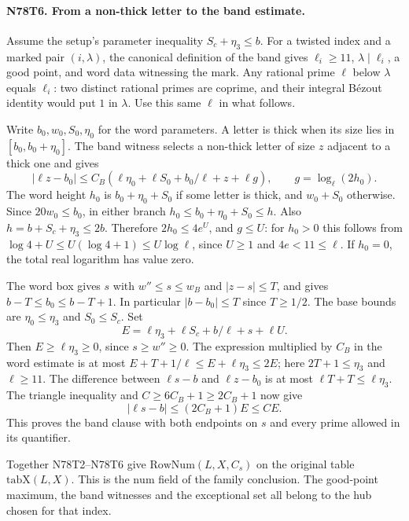 \paragraph{N78T6. From a non-thick letter to the band estimate.}
Assume the setup's parameter inequality $S_c+\eta_3\le b$.
For a twisted index and a marked pair $(i,\lambda)$, the canonical
definition of the band gives $\ell_i\ge11$, $\lambda\mid\ell_i$,
a good point, and word data witnessing the mark. Any rational prime
$\ell$ below $\lambda$ equals $\ell_i$: two distinct rational primes
are coprime, and their integral B\'ezout identity would put $1$ in
$\lambda$. Use this same $\ell$ in what follows.

Write $b_0,w_0,S_0,\eta_0$ for the word parameters. A letter is
thick when its size lies in $[b_0,b_0+\eta_0]$. The band witness
selects a non-thick letter of size $z$ adjacent to a thick one and gives
\[
 |\ell z-b_0|
    \le C_B(\ell\eta_0+\ell S_0+b_0/\ell+z+\ell g),\qquad
 g=\log_\ell(2h_0).
\]
The word height $h_0$ is $b_0+\eta_0+S_0$ if some letter is thick,
and $w_0+S_0$ otherwise. Since $20w_0\le b_0$, in either branch
$h_0\le b_0+\eta_0+S_0\le h$. Also $h=b+S_c+\eta_3\le 2b$.
Therefore $2h_0\le4e^U$, and $g\le U$: for $h_0>0$ this follows
from $\log4+U\le U(\log4+1)\le U\log\ell$, since $U\ge1$ and
$4e<11\le\ell$. If $h_0=0$, the total real logarithm has value zero.

The word box gives $s$ with $w''\le s\le w_B$ and $|z-s|\le T$,
and gives $b-T\le b_0\le b-T+1$. In particular $|b-b_0|\le T$
since $T\ge1/2$. The base bounds are $\eta_0\le\eta_3$ and
$S_0\le S_c$. Set
\[
      E=\ell\eta_3+\ell S_c+b/\ell+s+\ell U .
\]
Then $E\ge\ell\eta_3\ge0$, since $s\ge w''\ge0$. The expression
multiplied by $C_B$ in the word estimate is at most
$E+T+1/\ell\le E+\ell\eta_3\le2E$;
here $2T+1\le\eta_3$ and $\ell\ge11$. The difference between
$\ell s-b$ and $\ell z-b_0$ is at most $\ell T+T\le\ell\eta_3$.
The triangle inequality and $C\ge6C_B+1\ge2C_B+1$ now give
\[
  |\ell s-b|\le(2C_B+1)E\le CE .
\]
This proves the band clause with both endpoints on $s$ and every
prime allowed in its quantifier.

Together N78T2--N78T6 give $\mathrm{RowNum}(L,X,C_s)$ on the
original table $\mathrm{tabX}(L,X)$. This is the $\mathrm{num}$
field of the family conclusion. The good-point maximum, the band
witnesses and the exceptional set all belong to the hub chosen
for that index.
